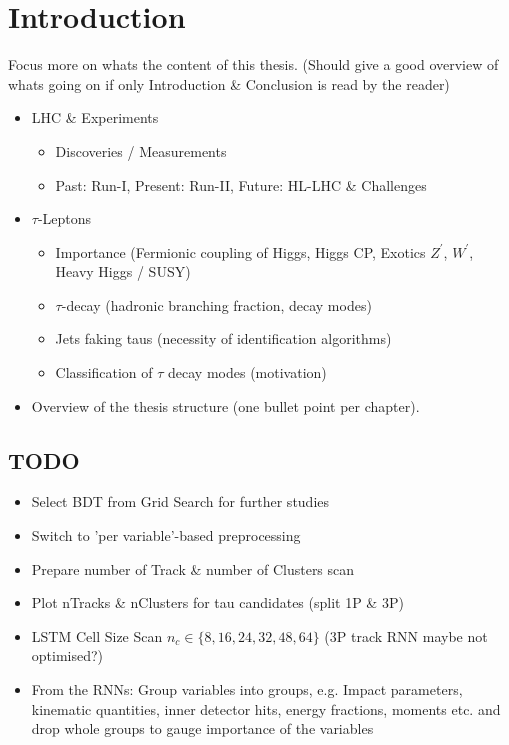\chapter*{Introduction}
\label{sec:intro}

Focus more on whats the content of this thesis. (Should give a good overview of
whats going on if only Introduction \& Conclusion is read by the reader)

\begin{itemize}
\item LHC \& Experiments
  \begin{itemize}
  \item Discoveries / Measurements

  \item Past: Run-I, Present: Run-II, Future: HL-LHC \& Challenges
  \end{itemize}

\item $\tau$-Leptons
  \begin{itemize}
  \item Importance (Fermionic coupling of Higgs, Higgs CP, Exotics $Z^\prime$,
    $W^\prime$, Heavy Higgs / SUSY)
  \item $\tau$-decay (hadronic branching fraction, decay modes)
  \item Jets faking taus (necessity of identification algorithms)
  \item Classification of $\tau$ decay modes (motivation)
  \end{itemize}

\item Overview of the thesis structure (one bullet point per chapter).
\end{itemize}

\section{TODO}
\label{sec:TODO}

\begin{itemize}
\item Select BDT from Grid Search for further studies
\item Switch to 'per variable'-based preprocessing
\item Prepare number of Track \& number of Clusters scan
\item Plot nTracks \& nClusters for tau candidates (split 1P \& 3P)
\item LSTM Cell Size Scan $n_c \in \{8, 16, 24, 32, 48, 64\}$ (3P track RNN
  maybe not optimised?)
\item From the RNNs: Group variables into groups, e.g. Impact parameters,
  kinematic quantities, inner detector hits, energy fractions, moments etc. and
  drop whole groups to gauge importance of the variables
\end{itemize}


